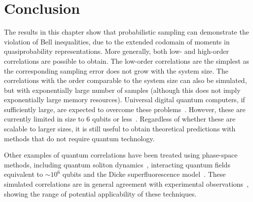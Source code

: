 \section{Conclusion}

The results in this chapter show that probabilistic sampling can demonstrate the violation of Bell inequalities, due to the extended codomain of moments in quasiprobability representations.
More generally, both low- and high-order correlations are possible to obtain.
The low-order correlations are the simplest as the corresponding sampling error does not grow with the system size.
The correlations with the order comparable to the system size can also be simulated, but with exponentially large number of samples (although this does not imply exponentially large memory resources).
Universal digital quantum computers, if sufficiently large, are expected to overcome these problems~\cite{Lloyd1996}.
However, these are currently limited in size to 6 qubits or less~\cite{Lanyon2011}.
Regardless of whether these are scalable to larger sizes, it is still useful to obtain theoretical predictions with methods that do not require quantum technology.

Other examples of quantum correlations have been treated using phase-space methods, including quantum soliton dynamics~\cite{Drummond1993a}, interacting quantum fields~\cite{Deuar2007} equivalent to $\sim10^{6}$ qubits and the Dicke superfluorescence model~\cite{Altland2012}.
These simulated correlations are in general agreement with experimental observations~\cite{Jaskula2010}, showing the range of potential applicability of these techniques.
